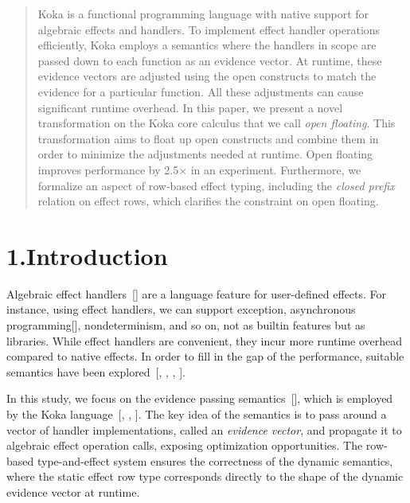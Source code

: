\documentclass{llncs}
\begin{document}

\mdxauthorend{}\mdxtitleblockend%

\begin{abstract}%

\noindent Koka is a functional programming language with native support for algebraic effects and handlers.
To implement effect handler operations efficiently, Koka employs a semantics where the handlers
in scope are passed down to each function as an evidence vector.
At runtime, these evidence vectors are adjusted using the open constructs to match the evidence
for
 a particular function. All these adjustments can cause significant runtime overhead.
In this paper, we present a novel transformation on the Koka core calculus
that we call \emph{open floating}. This transformation aims to float up open constructs and combine
them in order to minimize the adjustments needed at runtime.
Open floating improves performance by 2.5\ensuremath{\times} in an experiment.
Furthermore, we formalize an aspect of row-based effect typing,
including the \emph{closed prefix} relation on effect rows, which
clarifies the constraint on open floating.%
\end{abstract}%



\section{1.\hspace*{0.5em}Introduction}%

\noindent Algebraic effect handlers~[] are a language feature for user-defined effects.
For instance, using effect handlers, we can support exception, asynchronous programming[],
nondeterminism, and so on, not as builtin features but as libraries.
While effect handlers are convenient, they incur more runtime overhead compared to native effects.
In order to fill in the gap of the performance, suitable semantics have been explored~[, , , ].%

In this study, we focus on the evidence passing semantics~[],
which is employed by the Koka language~[, , ].
The key idea of the semantics is to pass around a vector of handler implementations,
called an \emph{evidence vector}, and propagate it to algebraic effect operation calls,
exposing optimization opportunities. The row-based type-and-effect system ensures the correctness of
the dynamic semantics, where the static effect row type corresponds directly to the shape of the dynamic
evidence vector at runtime.%
\end{document}
